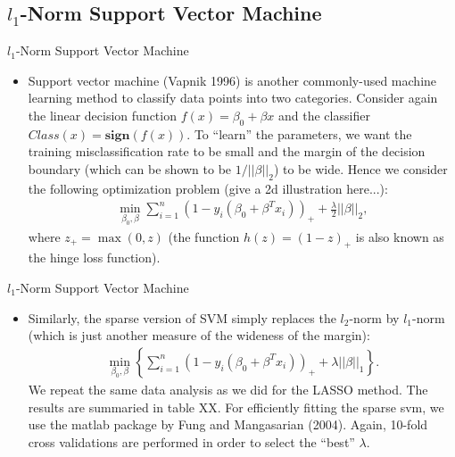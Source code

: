 \documentclass[12pt, trans]{beamer}
\newcommand{\1}[1]{{\mathbf 1}\left\{#1\right\}}        %
\begin{document}
\subsection{$l_1$-Norm Support Vector Machine}
\begin{frame}[fragile]{$l_1$-Norm Support Vector Machine}

\begin{itemize}[<+->]
\item  Support vector machine (Vapnik 1996) is another commonly-used machine learning method to classify data points into two categories. Consider again the linear decision function $f(x) = \beta_0 + \beta x$ and the classifier $Class(x) = \textbf{sign} (f(x))$. To ``learn'' the parameters, we want the training misclassification rate to be small and the margin of the decision boundary (which can be shown to be $1/||\beta||_2$) to be wide. Hence we consider the following optimization problem (give a 2d illustration here...):   
\begin{align*}
\min_{\beta_0,\beta} \sum_{i=1}^n(1-y_i(\beta_0+\beta^Tx_i))_+ + \frac{\lambda}{2} ||\beta||_2,
\end{align*}
where $z_+ = \max(0,z)$ (the function $h(z) = (1-z)_+$ is also known as the hinge loss function). 
\end{itemize}

\end{frame}


\begin{frame}[fragile]{$l_1$-Norm Support Vector Machine}

\begin{itemize}[<+->]  
\item Similarly, the sparse version of SVM simply replaces the $l_2$-norm by $l_1$-norm (which is just another measure of the wideness of the margin):
\begin{align*}
\min_{\beta_0,\beta} \left\{ \sum_{i=1}^n(1-y_i(\beta_0+\beta^Tx_i))_+ + \lambda ||\beta||_1\right\}. 
\end{align*}
We repeat the same data analysis as we did for the LASSO method. The results are summaried in table XX. For efficiently fitting the sparse svm, we use the matlab package by Fung and Mangasarian (2004). Again, 10-fold cross validations are performed in order to select the ``best'' $\lambda$.

\end{itemize}

\end{frame}
\end{document}

